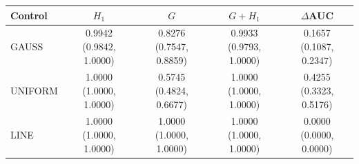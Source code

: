 \begin{tabular}{lcccc}
\toprule
Control & $H_1$ & $G$ & $G+H_1$ & $\Delta$AUC \\
\midrule
GAUSS & \shortstack{0.9942\\(0.9842, 1.0000)} & \shortstack{0.8276\\(0.7547, 0.8859)} & \shortstack{0.9933\\(0.9793, 1.0000)} & \shortstack{0.1657\\(0.1087, 0.2347)} \\[3pt]
UNIFORM & \shortstack{1.0000\\(1.0000, 1.0000)} & \shortstack{0.5745\\(0.4824, 0.6677)} & \shortstack{1.0000\\(1.0000, 1.0000)} & \shortstack{0.4255\\(0.3323, 0.5176)} \\[3pt]
LINE & \shortstack{1.0000\\(1.0000, 1.0000)} & \shortstack{1.0000\\(1.0000, 1.0000)} & \shortstack{1.0000\\(1.0000, 1.0000)} & \shortstack{0.0000\\(0.0000, 0.0000)} \\[3pt]
\bottomrule
\end{tabular}
